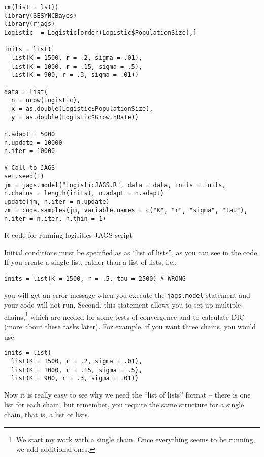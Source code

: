 \documentclass[12pt,english]{article}
\begin{document}
\begin{algorithm}
\begin{Verbatim}[frame=single]
rm(list = ls())
library(SESYNCBayes)
library(rjags)
Logistic  = Logistic[order(Logistic$PopulationSize),]

inits = list(
  list(K = 1500, r = .2, sigma = .01),
  list(K = 1000, r = .15, sigma = .5),
  list(K = 900, r = .3, sigma = .01))

data = list(
  n = nrow(Logistic),
  x = as.double(Logistic$PopulationSize),
  y = as.double(Logistic$GrowthRate))

n.adapt = 5000
n.update = 10000
n.iter = 10000

# Call to JAGS
set.seed(1)
jm = jags.model("LogisticJAGS.R", data = data, inits = inits, 
n.chains = length(inits), n.adapt = n.adapt)
update(jm, n.iter = n.update)
zm = coda.samples(jm, variable.names = c("K", "r", "sigma", "tau"),
n.iter = n.iter, n.thin = 1)
\end{Verbatim}
\caption{R code for running logisitics JAGS script}
\label{alg:R-code-for}
\end{algorithm}

Initial conditions must be specified as as \enquote{list of lists}, as you can see in the code. If you create a single list, rather than a list of lists, i.e.:

\begin{Verbatim}
inits = list(K = 1500, r = .5, tau = 2500) # WRONG
\end{Verbatim}

\noindent you will get an error message when you execute the \texttt{jags.model} statement and your code will not run. Second, this statement allows you to set up multiple chains,\footnote{We start my work with a single chain. Once everything seems to be running, we add additional ones.} which are needed for some tests of convergence and to calculate DIC (more about these tasks later). For example, if you want three chains, you would use:

\begin{Verbatim}
inits = list(
  list(K = 1500, r = .2, sigma = .01),
  list(K = 1000, r = .15, sigma = .5),
  list(K = 900, r = .3, sigma = .01))
\end{Verbatim}

\noindent Now it is really easy to see why we need the \enquote{list of lists} format -- there is one list for each chain; but remember, you require the same structure for a single chain, that is, a list of lists.
\end{document}
